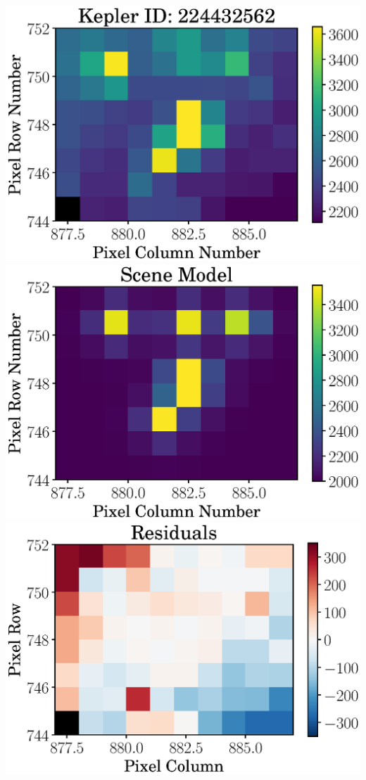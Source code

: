 \documentclass[landscape,a0b,final]{a0poster}
\newenvironment{poster}{
  \begin{center}
  \begin{minipage}[c]{0.98\textwidth}
}{
  \end{minipage}
  \end{center}
}
\newenvironment{pcolumn}[1]{
  \begin{minipage}{#1\textwidth}
  \begin{center}
}{
  \end{center}
  \end{minipage}
}
\begin{document}
\begin{poster}
\begin{center}
\begin{pcolumn}{0.32}
{    \includegraphics[width=16cm,angle=0]{figs/tpf_c9.eps}
    \includegraphics[width=16cm,angle=0]{figs/model_c9.eps}
    \includegraphics[width=16cm,angle=0]{figs/residuals_c9.eps}
}
\end{pcolumn}
\end{center}
\end{poster}
\end{document}
